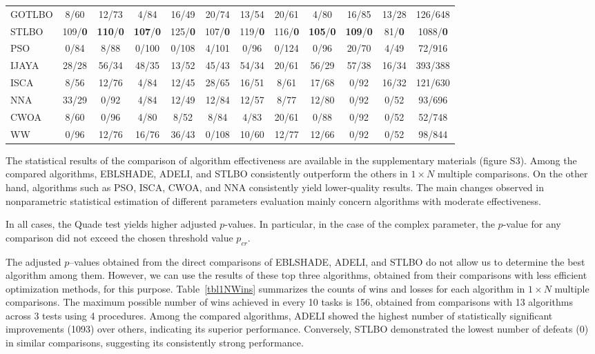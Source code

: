 \documentclass[a4paper,fleqn]{cas-sc}
\begin{document}
\begin{table}[<options>]
\begin{tabular*}{\tblwidth}{@{}LCCCCCCCCCCC@{}}
GOTLBO & 8/60  & 12/73  & 4/84  & 16/49  & 20/74  & 13/54 & 20/61  & 4/80 & 16/85  & 13/28  & 126/648\\
STLBO & 109/\textbf{0} & \textbf{110}/\textbf{0}  & \textbf{107}/\textbf{0}  & 125/\textbf{0}  & 107/\textbf{0}  & 119/\textbf{0}  & 116/\textbf{0}  & \textbf{105}/\textbf{0}  & \textbf{109}/\textbf{0} & 81/\textbf{0}  & 1088/\textbf{0}\\
PSO & 0/84  & 8/88  & 0/100  & 0/108  & 4/101  & 0/96  &  0/124 & 0/96  & 20/70  & 4/49  & 72/916\\
IJAYA &  28/28 &  56/34 &  48/35 & 13/52  & 45/43 &  54/34 &  20/61 & 56/29  & 57/38  & 16/34  & 393/388\\
ISCA & 8/56  & 12/76  & 4/84  & 12/45  & 28/65  & 16/51  & 8/61  & 17/68  & 0/92  & 16/32  & 121/630\\
NNA & 33/29  & 0/92  & 4/84  & 12/49  & 12/84  & 12/57  & 8/77  & 12/80  & 0/92& 0/52  & 93/696\\
CWOA & 8/60  & 0/96  &  4/80& 8/52  & 8/84& 4/83  & 20/61  & 0/88  & 0/92 & 0/52  & 52/748\\
WW & 0/96  & 12/76  & 16/76&  36/43 & 0/108 & 10/60 & 12/77  & 12/66  & 0/92& 0/52  & 98/844\\
\bottomrule
\end{tabular*}
\end{table}


The statistical results of the comparison of algorithm effectiveness are available in the supplementary materials (figure S3).
Among the compared algorithms, EBLSHADE, ADELI, and STLBO consistently outperform the others in $1\times N$ multiple comparisons.
On the other hand, algorithms such as PSO, ISCA, CWOA, and NNA consistently yield lower-quality results.
The main changes observed in nonparametric statistical estimation of different parameters evaluation
mainly concern algorithms with moderate effectiveness.



In all cases, the Quade test yields higher adjusted $p$-values.
In particular, in the case of the complex parameter, the $p$-value for any comparison did not exceed the chosen threshold value $p_{cr}$.



The adjusted $p$--values obtained from the direct comparisons of EBLSHADE, ADELI, and STLBO
do not allow us to determine the best algorithm among them.
However, we can use the results of these top three algorithms,
obtained from their comparisons with less efficient optimization methods, for this purpose.
Table~\ref{tbl1NWins} summarizes the counts of wins and losses for each algorithm in $1\times N$ multiple comparisons.
The maximum possible number of wins achieved in every 10 tasks is 156,
obtained from comparisons with 13 algorithms across 3 tests using 4 procedures.
Among the compared algorithms, ADELI showed the highest number of statistically
significant improvements (1093) over others,
indicating its superior performance.
Conversely, STLBO demonstrated the lowest number of defeats (0)
in similar comparisons, suggesting its consistently strong performance.
\end{document}
